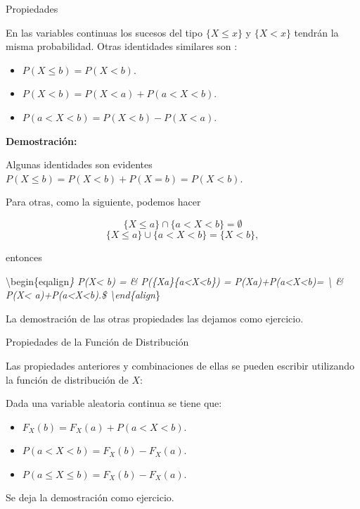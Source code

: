 \documentclass[
  letterpaper,
  DIV=11,
  numbers=noendperiod]{scrreprt}
\providecommand{\tightlist}{%
  \setlength{\itemsep}{0pt}\setlength{\parskip}{0pt}}\usepackage{longtable,booktabs,array}
\begin{document}
\begin{Proposicion}{Propiedades}{}

En las variables continuas los sucesos del tipo \(\{X\leq x \}\) y
\(\{X< x \}\) tendrán la misma probabilidad. Otras identidades similares
son :

\begin{itemize}
\tightlist
\item
  \(P(X\leq b)=P(X<b)\).
\item
  \(P(X<b)=P(X<a)+P(a<X<b)\).
\item
  \(P(a<X<b)=P(X<b)-P(X<a)\).
\end{itemize}

\end{Proposicion}

\textbf{Demostración:}

Algunas identidades son evidentes \(P(X\leq b)=P(X<b)+P(X=b)=P(X<b).\)

Para otras, como la siguiente, podemos hacer

\[\{X\leq a\}\cap \{a<X<b\}=\emptyset\]
\[\{X\leq a\}\cup \{a<X<b\}=\{X<b\},\]

entonces

\textbackslash begin\{eqalign\emph{\} P(X\textless{} b) = \&
P(\{X\leq a\}\cup \{a\textless X\textless b\}) =
P(X\leq a)+P(a\textless X\textless b)= \textbackslash{} \&
P(X\textless{} a)+P(a\textless X\textless b).\$
\textbackslash end\{align}\}

La demostración de las otras propiedades las dejamos como ejercicio.

\begin{Proposicion}{Propiedades de la Función de Distribución}{}

Las propiedades anteriores y combinaciones de ellas se pueden escribir
utilizando la función de distribución de \(X\):

Dada una variable aleatoria continua se tiene que:

\begin{itemize}
\tightlist
\item
  \(F_{X}(b)=F_{X}(a)+P(a<X<b)\).
\item
  \(P(a<X<b)=F_{X}(b)-F_{X}(a)\).
\item
  \(P(a\leq X\leq b)=F_{X}(b)-F_{X}(a)\).
\end{itemize}

\end{Proposicion}

Se deja la demostración como ejercicio.
\end{document}
